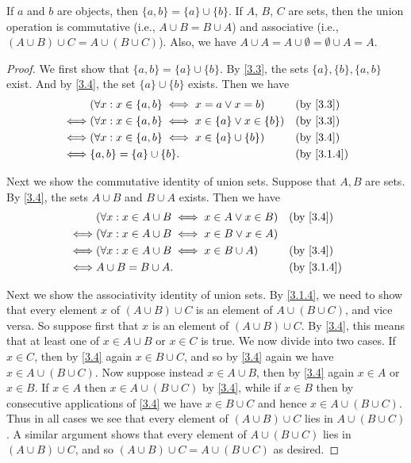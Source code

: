 \begin{lem}\label{3.1.13}
  If \(a\) and \(b\) are objects, then \(\{a, b\} = \{a\} \cup \{b\}\).
  If \(A\), \(B\), \(C\) are sets, then the union operation is commutative (i.e., \(A \cup B = B \cup A\)) and associative (i.e., \((A \cup B) \cup C = A \cup (B \cup C)\)).
  Also, we have \(A \cup A = A \cup \emptyset = \emptyset \cup A = A\).
\end{lem}

\begin{proof}
  We first show that \(\{a, b\} = \{a\} \cup \{b\}\).
  By \cref{3.3}, the sets \(\{a\}, \{b\}, \{a, b\}\) exist.
  And by \cref{3.4}, the set \(\{a\} \cup \{b\}\) exists.
  Then we have
  \begin{align*}
         & (\forall x : x \in \{a, b\} \iff x = a \lor x = b)             &  & \text{(by \cref{3.3})}   \\
    \iff & (\forall x : x \in \{a, b\} \iff x \in \{a\} \lor x \in \{b\}) &  & \text{(by \cref{3.3})}   \\
    \iff & (\forall x : x \in \{a, b\} \iff x \in \{a\} \cup \{b\})       &  & \text{(by \cref{3.4})}   \\
    \iff & \{a, b\} = \{a\} \cup \{b\}.                                   &  & \text{(by \cref{3.1.4})}
  \end{align*}

  Next we show the commutative identity of union sets.
  Suppose that \(A, B\) are sets.
  By \cref{3.4}, the sets \(A \cup B\) and \(B \cup A\) exists.
  Then we have
  \begin{align*}
         & (\forall x : x \in A \cup B \iff x \in A \lor x \in B) &  & \text{(by \cref{3.4})}   \\
    \iff & (\forall x : x \in A \cup B \iff x \in B \lor x \in A)                               \\
    \iff & (\forall x : x \in A \cup B \iff x \in B \cup A)       &  & \text{(by \cref{3.4})}   \\
    \iff & A \cup B = B \cup A.                                   &  & \text{(by \cref{3.1.4})}
  \end{align*}

  Next we show the associativity identity of union sets.
  By \cref{3.1.4}, we need to show that every element \(x\) of \((A \cup B) \cup C\) is an element of \(A \cup (B \cup C)\), and vice versa.
  So suppose first that \(x\) is an element of \((A \cup B) \cup C\).
  By \cref{3.4}, this means that at least one of \(x \in A \cup B\) or \(x \in C\) is true.
  We now divide into two cases.
  If \(x \in C\), then by \cref{3.4} again \(x \in B \cup C\), and so by \cref{3.4} again we have \(x \in A \cup (B \cup C)\).
  Now suppose instead \(x \in A \cup B\), then by \cref{3.4} again \(x \in A\) or \(x \in B\).
  If \(x \in A\) then \(x \in A \cup (B \cup C)\) by \cref{3.4}, while if \(x \in B\) then by consecutive applications of \cref{3.4} we have \(x \in B \cup C\) and hence \(x \in A \cup (B \cup C)\).
  Thus in all cases we see that every element of \((A \cup B) \cup C\) lies in \(A \cup (B \cup C)\).
  A similar argument shows that every element of \(A \cup (B \cup C)\) lies in \((A \cup B) \cup C\), and so \((A \cup B) \cup C = A \cup (B \cup C) \) as desired.


\end{proof}
